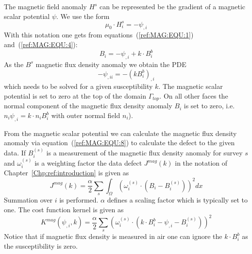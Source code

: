The magnetic field anomaly $H^s$ can be represented be the gradient of a magnetic scalar potential
$\psi$. We use the form 
\begin{equation}\label{ref:MAG:EQU:6}
\mu_0  \cdot H^s_i = - \psi_{,i}
\end{equation}
With this notation one gets from equations~(\ref{ref:MAG:EQU:1}) and~(\ref{ref:MAG:EQU:4}):
\begin{equation}\label{ref:MAG:EQU:7}
B_i = - \psi_{,i}  + k \cdot B^b_i
\end{equation}
As the $B^s$ magnetic flux density anomaly we obtain the PDE  
\begin{equation}\label{ref:MAG:EQU:8}
- \psi_{,ii} = - (k B^b_i)_{,i} 
\end{equation} 
which needs to be solved for a given susceptibility $k$. The magnetic scalar potential is set to zero 
at the top of the domain $\Gamma_{top}$. On all other faces the normal component of the magnetic flux density anomaly $B_i$
is set to zero, i.e. $n_i \psi_{,i}  = k \cdot n_i  B^b_i$ with outer normal field $n_i$).

From the magnetic scalar potential we can calculate the magnetic flux density anomaly via equation~(\ref{ref:MAG:EQU:8}) to
calculate the defect to the given data. If $B^{(s)}_i$ is a measurement of the magnetic flux density anomaly for 
survey $s$ and $\omega^{(s)}_i$ is a weighting factor the data defect $J^{mag}(k)$ in the notation of Chapter~\ref{Chp:ref:introduction}
is given as
\begin{equation}\label{ref:MAG:EQU:9}
J^{mag}(k) = \frac{\alpha}{2}\sum_{s} \int_{\Omega} ( \omega^{(s)}_i \cdot (B_{i}- B^{(s)}_i) ) ^2 dx
\end{equation} 
Summation over $i$ is performed. $\alpha$ defines a scaling factor which is typically set to one.
The cost function kernel is given as
\begin{equation}\label{ref:MAG:EQU:10}
K^{mag}(\psi_{,i},k) = \frac{\alpha}{2}\sum_{s} ( \omega^{(s)}_i \cdot (k \cdot B^b_i - \psi_{,i} - B^{(s)}_i) ) ^2
\end{equation} 
Notice that if magnetic flux density is measured in air one can ignore the $k \cdot B^b_i$ as the susceptibility is zero.

